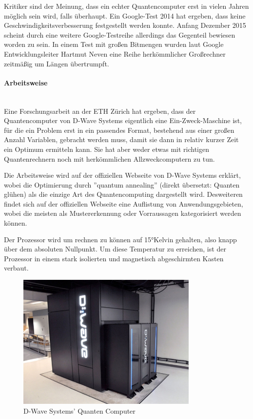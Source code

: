 Kritiker sind der Meinung, dass ein echter Quantencomputer erst in vielen Jahren möglich sein wird, falls überhaupt. Ein Google-Test 2014 hat ergeben, dass keine Geschwindigkeitsverbesserung festgestellt werden konnte. Anfang Dezember 2015 scheint durch eine weitere Google-Testreihe allerdings das Gegenteil bewiesen worden zu sein. In einem Test mit großen Bitmengen wurden laut Google Entwicklungsleiter Hartmut Neven eine Reihe herkömmlicher Großrechner zeitmäßig um Längen übertrumpft. \cite{dwave1} \cite{dwave2}

\paragraph{Arbeitsweise} ~\\
Eine Forschungsarbeit an der ETH Zürich hat ergeben, dass der Quantencomputer von D-Wave Systems eigentlich eine Ein-Zweck-Maschine ist, für die ein Problem erst in ein passendes Format, bestehend aus einer großen Anzahl Variablen, gebracht werden muss, damit sie dann in relativ kurzer Zeit ein Optimum ermitteln kann. Sie hat aber weder etwas mit richtigen Quantenrechnern noch mit herkömmlichen Allzweckcomputern zu tun. \cite{dwave3} \cite{dwave4}

Die Arbeitsweise wird auf der offiziellen Webseite von D-Wave Systems erklärt, wobei die Optimierung durch ''quantum annealing'' (direkt übersetzt: Quanten glühen) als die einzige Art des Quantencomputing dargestellt wird. \cite{dwave5}
Desweiteren findet sich auf der offiziellen Webseite eine Auflistung von Anwendungsgebieten, wobei die meisten als Mustererkennung oder Vorraussagen kategorisiert werden können. \cite{dwave6}

Der Prozessor wird um rechnen zu können auf 15°Kelvin gehalten, also knapp über dem absoluten Nullpunkt. Um diese Temperatur zu erreichen, ist der Prozessor in einem stark isolierten und magnetisch abgeschirmten Kasten verbaut.

\begin{figure}[!htb]
	\centering\includegraphics[width=0.8\textwidth]{images/d_wave_out}
	\caption{D-Wave Systems' Quanten Computer}
	\label{dwave2}
\end{figure}

